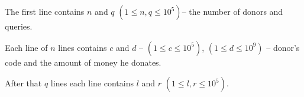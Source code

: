 The first line contains $n$ and $q$ $(1 \le n,q \le 10^5)$-- the number of donors and queries.

Each line of $n$ lines contains $c$ and $d$ -- $(1 \le c \le 10^5)$, $(1\le d\le 10^9)$ -- donor's code and the amount of money he donates.

After that $q$ lines each line contains $l$ and $r$ $(1 \le l,r \le 10^5)$.
